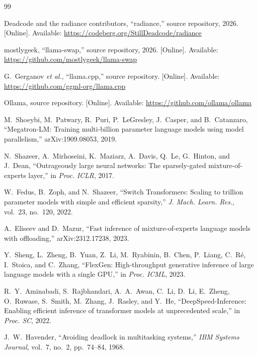 \documentclass[10pt,conference,a4paper]{IEEEtran}
\begin{document}
\begin{thebibliography}{99}\footnotesize

 Deadcode and the radiance contributors, ``radiance,'' source repository, 2026. [Online]. Available: \url{https://codeberg.org/StillDeadcode/radiance}

 mostlygeek, ``llama-swap,'' source repository, 2026. [Online]. Available: \url{https://github.com/mostlygeek/llama-swap}

 G.~Gerganov \emph{et al.}, ``llama.cpp,'' source repository. [Online]. Available: \url{https://github.com/ggml-org/llama.cpp}

 Ollama, source repository. [Online]. Available: \url{https://github.com/ollama/ollama}

 M.~Shoeybi, M.~Patwary, R.~Puri, P.~LeGresley, J.~Casper, and B.~Catanzaro, ``Megatron-LM: Training multi-billion parameter language models using model parallelism,'' arXiv:1909.08053, 2019.

 N.~Shazeer, A.~Mirhoseini, K.~Maziarz, A.~Davis, Q.~Le, G.~Hinton, and J.~Dean, ``Outrageously large neural networks: The sparsely-gated mixture-of-experts layer,'' in \emph{Proc. ICLR}, 2017.

 W.~Fedus, B.~Zoph, and N.~Shazeer, ``Switch Transformers: Scaling to trillion parameter models with simple and efficient sparsity,'' \emph{J. Mach. Learn. Res.}, vol.~23, no.~120, 2022.

 A.~Eliseev and D.~Mazur, ``Fast inference of mixture-of-experts language models with offloading,'' arXiv:2312.17238, 2023.

 Y.~Sheng, L.~Zheng, B.~Yuan, Z.~Li, M.~Ryabinin, B.~Chen, P.~Liang, C.~R\'e, I.~Stoica, and C.~Zhang, ``FlexGen: High-throughput generative inference of large language models with a single GPU,'' in \emph{Proc. ICML}, 2023.

 R.~Y.~Aminabadi, S.~Rajbhandari, A.~A.~Awan, C.~Li, D.~Li, E.~Zheng, O.~Ruwase, S.~Smith, M.~Zhang, J.~Rasley, and Y.~He, ``DeepSpeed-Inference: Enabling efficient inference of transformer models at unprecedented scale,'' in \emph{Proc. SC}, 2022.

 J.~W.~Havender, ``Avoiding deadlock in multitasking systems,'' \emph{IBM Systems Journal}, vol.~7, no.~2, pp.~74--84, 1968.


\end{thebibliography}
\end{document}
